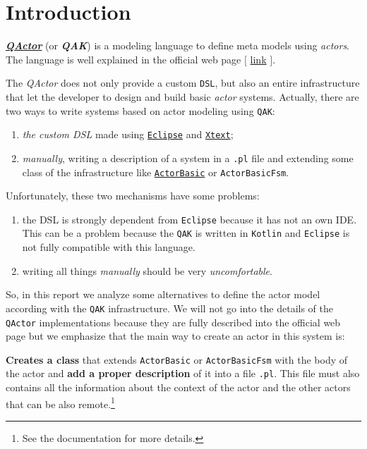 \section{Introduction}

\href{http://htmlpreview.github.io/?https://github.com/anatali/issLab2021/blob/main/it.unibo.qakactor/userDocs/LabQakIntro2021.html}{\textbf{\textit{QActor}}} (or \textbf{\textit{QAK}}) is a modeling language to define meta models using \textit{actors}. The language is well explained in the official web page $\big[$ \href{http://htmlpreview.github.io/?https://github.com/anatali/issLab2021/blob/main/it.unibo.qakactor/userDocs/LabQakIntro2021.html}{link} $\big]$.

The \textit{QActor} does not only provide a custom \texttt{DSL}, but also an entire infrastructure that let the developer to design and build basic \textit{actor} systems.
Actually, there are two ways to write systems based on actor modeling using \texttt{QAK}:
\begin{enumerate}
	\item \textit{the custom DSL} made using \href{https://www.eclipse.org/}{\texttt{Eclipse}} and \href{https://www.eclipse.org/Xtext/}{\texttt{Xtext}};
	\item \textit{manually}, writing a description of a system in a \texttt{.pl} file and extending some class of the infrastructure like \href{https://htmlpreview.github.io/?https://github.com/anatali/issLab2021/blob/main/it.unibo.qakactor/userDocs/LabQakIntro2021.html\#ActorBasic}{\texttt{ActorBasic}} or \texttt{ActorBasicFsm}.
\end{enumerate}

Unfortunately, these two mechanisms have some problems:
\begin{enumerate}
	\item the DSL is strongly dependent from \texttt{Eclipse} because it has not an own IDE.
	This can be a problem because the \texttt{QAK} is written in \texttt{Kotlin} and \texttt{Eclipse} is not fully compatible with this language.
	\item writing all things \textit{manually} should be very \textit{uncomfortable}.	
\end{enumerate}

So, in this report we analyze some alternatives to define the actor model according with the \texttt{QAK} infrastructure. We will not go into the details of the \texttt{QActor} implementations because they are fully described into the official web page but we emphasize that the main way to create an actor in this system is:
\begin{center}
	\textbf{Creates a class} that extends \texttt{ActorBasic} or \texttt{ActorBasicFsm} with the body of the actor and \textbf{add a proper description} of it into a file \texttt{.pl}. This file must also contains all the information about the context of the actor and the other actors that can be also remote.\footnote{See the documentation for more details.}
\end{center}


